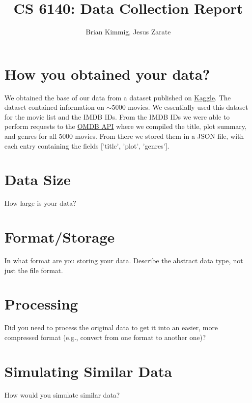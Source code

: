 \documentclass[12pt]{article}
\title{CS 6140: Data Collection Report}
\author{Brian Kimmig, Jesus Zarate}
\date{}
\begin{document}
\maketitle

\section{How you obtained your data?}

We obtained the base of our data from a dataset published on \href{https://www.kaggle.com/deepmatrix/imdb-5000-movie-dataset}{Kaggle}. The dataset contained information on $\sim5000$ movies. We essentially used this dataset for the movie list and the IMDB IDs. From the IMDB IDs we were able to perform requests to the  \href{https://www.omdbapi.com/}{OMDB API} where we compiled the title, plot summary, and genres for all 5000 movies. From there we stored them in a JSON file, with each entry containing the fields ['title', 'plot', 'genres'].

\section{Data Size}
How large is your data?

\section{Format/Storage}
In what format are you storing your data. Describe the abstract data type, not just the file format.

\section{Processing}
Did you need to process the original data to get it into an easier, more compressed format (e.g., convert from one format to another one)?

\section{Simulating Similar Data}
How would you simulate similar data?
\end{document}
